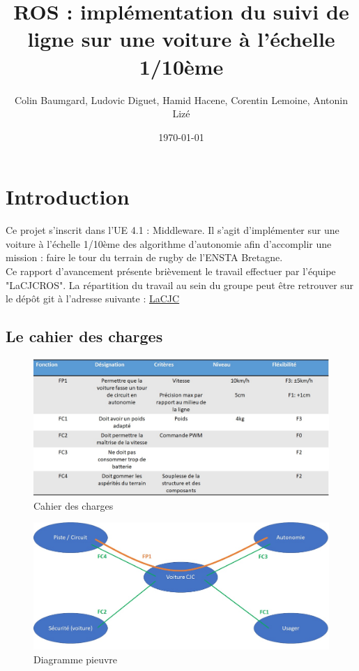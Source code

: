 \documentclass[12pt, openany]{report}
\title{ROS : implémentation du suivi de ligne sur une voiture à l'échelle 1/10ème}
\author{Colin Baumgard, Ludovic Diguet, Hamid Hacene, Corentin Lemoine, Antonin Lizé}
\date{\today}
\begin{document}
\maketitle
\tableofcontents
\pagebreak
\section{Introduction}
Ce projet s'inscrit dans l'UE 4.1 : Middleware. Il s'agit d'implémenter sur une voiture à l'échelle 1/10ème des algorithme d'autonomie afin d'accomplir une mission : faire le tour du terrain de rugby de l'ENSTA Bretagne. 
\\

Ce rapport d'avancement présente brièvement le travail effectuer par l'équipe "LaCJCROS". La répartition du travail au sein du groupe peut être retrouver sur le dépôt git à l'adresse suivante : \href{https://github.com/HamidHacene/laCJC_ROS/projects/1}{LaCJC}

\subsection{Le cahier des charges}
      \begin{figure}[!h]
      \begin{center}
        \hfill \includegraphics[scale=0.5]{imgs/Cahier_des_charges.jpg} \hspace*{\fill}
        \caption{Cahier des charges}
      \end{center}
      \end{figure}

      \begin{figure}[!h]
      \begin{center}
        \hfill \includegraphics[scale=0.5]{imgs/Diagramme_pieuvre.jpg} \hspace*{\fill}
        \caption{Diagramme pieuvre}
      \end{center}
      \end{figure}
\end{document}
